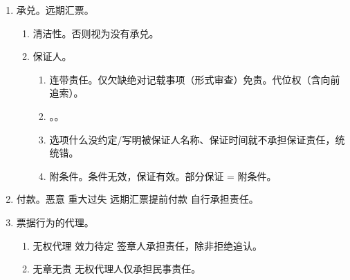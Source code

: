 \begin{enumerate}
  \item 承兑。远期汇票。
        \begin{enumerate}
          \item 清洁性。否则视为没有承兑。
          \item 保证人。
                \begin{enumerate}
                  \item 连带责任。仅欠缺绝对记载事项（形式审查）免责。代位权（含向前追索）。
                  \item {}。。
                  \item 选项什么没约定/写明被保证人名称、保证时间就不承担保证责任，统统错。
                  \item 附条件。条件无效，保证有效。部分保证 = 附条件。
                \end{enumerate}
        \end{enumerate}
  \item 付款。恶意 \hz 重大过失 \hz 远期汇票提前付款 \yjt 自行承担责任。
  \item 票据行为的代理。
        \begin{enumerate}
          \item 无权代理 \yjt 效力待定 \yjt 签章人承担责任，除非拒绝追认。
          \item 无章无责 \yjt 无权代理人仅承担民事责任。
        \end{enumerate}
\end{enumerate}
